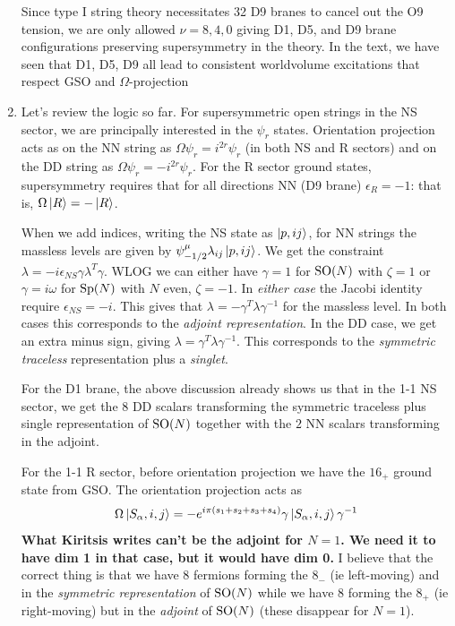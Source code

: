\documentclass[11pt, class=article, crop=false]{standalone}
\begin{document}
\begin{enumerate}
	 Since type I string theory necessitates 32 D9 branes to cancel out the O9 tension, we are only allowed $\nu=8,4,0$ giving D1, D5, and D9 brane configurations preserving supersymmetry in the theory.
	In the text, we have seen that D1, D5, D9 all lead to consistent worldvolume excitations that respect GSO and $\Omega$-projection 
	
	\item Let's review the logic so far. For supersymmetric open strings in the NS sector, we are principally interested in the $\psi_r$ states. Orientation projection acts as on the NN string as $\Omega \psi_r = i^{2r} \psi_r$ (in both NS and R sectors) and on the DD string as $\Omega \psi_r = - i^{2r} \psi_r$. For the R sector ground states, supersymmetry requires that for all directions NN (D9 brane) $\epsilon_R = -1$: that is, $\Omega \ket{R} = - \ket{R}$. 
	
	When we add indices, writing the NS state as $\ket{p, ij}$, for NN strings the massless levels are given by $\psi_{-1/2}^\mu \lambda_{ij} \ket{p, ij}$. We get the constraint $\lambda = -i \epsilon_{NS} \gamma \lambda^T \gamma$. WLOG we can either have $\gamma = 1$ for $\mathrm{SO}(N)$ with $\zeta = 1$ or $\gamma = i \omega$ for $\mathrm{Sp}(N)$ with $N$ even, $\zeta = -1$. In \emph{either case} the Jacobi identity require $\epsilon_{NS} = - i$. This gives that $\lambda = - \gamma^T \lambda \gamma^{-1}$ for the massless level. In both cases this corresponds to the \emph{adjoint representation}. In the DD case, we get an extra minus sign, giving $\lambda = \gamma^T \lambda \gamma^{-1}$. This corresponds to the \emph{symmetric traceless} representation plus a \emph{singlet}.
	
	For the D1 brane, the above discussion already shows us that in the 1-1 NS sector, we get the $8$ DD scalars transforming the symmetric traceless plus single representation of $\mathrm{SO}(N)$ together with the $2$ NN scalars transforming in the adjoint. 
	
	For the 1-1 R sector, before orientation projection we have the $16_+$ ground state from GSO. The orientation projection acts as
	\[
		\Omega \ket{S_\alpha, i, j} = - e^{i \pi (s_1 + s_2 + s_3 + s_4)} \gamma \ket{S_\alpha, i, j} \gamma^{-1}
	\]
	\textbf{What Kiritsis writes can't be the adjoint for $N=1$. We need it to have dim 1 in that case, but it would have dim 0.} I believe that the correct thing is that we have 8 fermions forming the $8_-$ (ie left-moving) and in the \emph{symmetric representation} of $\mathrm{SO}(N)$ while we have 8 forming the $8_+$ (ie right-moving) but in the \emph{adjoint} of $\mathrm{SO}(N)$ (these disappear for $N = 1$).
	

\end{enumerate}
\end{document}
